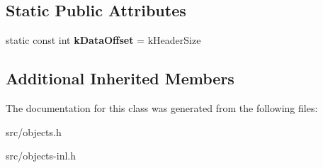 \subsection*{Static Public Attributes}
\begin{DoxyCompactItemize}
\item 
\hypertarget{classv8_1_1internal_1_1_fixed_typed_array_base_a5fd5c68af6f41a1e5659e0523b2b9444}{}static const int {\bfseries k\+Data\+Offset} = k\+Header\+Size\label{classv8_1_1internal_1_1_fixed_typed_array_base_a5fd5c68af6f41a1e5659e0523b2b9444}

\end{DoxyCompactItemize}
\subsection*{Additional Inherited Members}


The documentation for this class was generated from the following files\+:\begin{DoxyCompactItemize}
\item 
src/objects.\+h\item 
src/objects-\/inl.\+h\end{DoxyCompactItemize}
